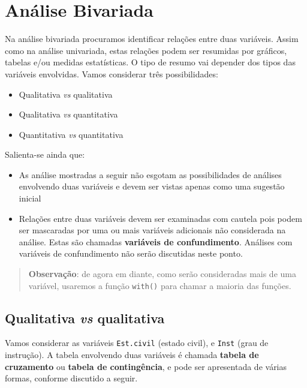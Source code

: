 \documentclass[10pt,a4paper]{book}
\providecommand{\tightlist}{%
  \setlength{\itemsep}{0pt}\setlength{\parskip}{0pt}}
\begin{document}
\section{Análise Bivariada}\label{anuxe1lise-bivariada}

Na análise bivariada procuramos identificar relações entre duas
variáveis. Assim como na análise univariada, estas relações podem ser
resumidas por gráficos, tabelas e/ou medidas estatísticas. O tipo de
resumo vai depender dos tipos das variáveis envolvidas. Vamos considerar
três possibilidades:

\begin{itemize}
\tightlist
\item
  Qualitativa \emph{vs} qualitativa
\item
  Qualitativa \emph{vs} quantitativa
\item
  Quantitativa \emph{vs} quantitativa
\end{itemize}

Salienta-se ainda que:

\begin{itemize}
\tightlist
\item
  As análise mostradas a seguir não esgotam as possibilidades de
  análises envolvendo duas variáveis e devem ser vistas apenas como uma
  sugestão inicial
\item
  Relações entre duas variáveis devem ser examinadas com cautela pois
  podem ser mascaradas por uma ou mais variáveis adicionais não
  considerada na análise. Estas são chamadas \textbf{variáveis de
  confundimento}. Análises com variáveis de confundimento não serão
  discutidas neste ponto.
\end{itemize}

\begin{quote}
\textbf{Observação}: de agora em diante, como serão consideradas mais de
uma variável, usaremos a função \texttt{with()} para chamar a maioria
das funções.
\end{quote}

\subsection{\texorpdfstring{Qualitativa \emph{vs}
qualitativa}{Qualitativa vs qualitativa}}\label{qualitativa-vs-qualitativa}

Vamos considerar as variáveis \texttt{Est.civil} (estado civil), e
\texttt{Inst} (grau de instrução). A tabela envolvendo duas variáveis é
chamada \textbf{tabela de cruzamento} ou \textbf{tabela de
contingência}, e pode ser apresentada de várias formas, conforme
discutido a seguir.
\end{document}
